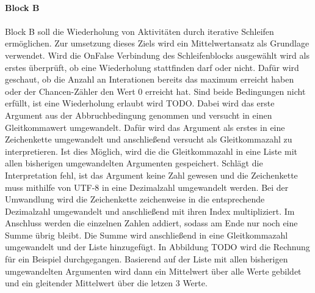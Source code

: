 \documentclass{article}
\begin{document}
    \\
    \textbf{Block B}\\
    \\
    Block B soll die Wiederholung von Aktivitäten durch iterative Schleifen ermöglichen.
    Zur umsetzung dieses Ziels wird ein Mittelwertansatz als Grundlage verwendet.
    Wird die OnFalse Verbindung des Schleifenblocks ausgewählt wird als erstes überprüft, ob eine Wiederholung stattfinden darf oder nicht.
    Dafür wird geschaut, ob die Anzahl an Interationen bereits das maximum erreicht haben oder der Chancen-Zähler den Wert 0 erreicht hat.
    Sind beide Bedingungen nicht erfüllt, ist eine Wiederholung erlaubt wird TODO.
    Dabei wird das erste Argument aus der Abbruchbedingung genommen und versucht in einen Gleitkommawert umgewandelt. %
    Dafür wird das Argument als erstes in eine Zeichenkette umgewandelt und anschließend versucht als Gleitkommazahl zu interpretieren.
    Ist dies Möglich, wird die die Gleitkommazahl in eine Liste mit allen bisherigen umgewandelten Argumenten gespeichert.
    Schlägt die Interpretation fehl, ist das Argument keine Zahl gewesen und die Zeichenkette muss mithilfe von UTF-8 in eine Dezimalzahl umgewandelt werden.
    Bei der Umwandlung wird die Zeichenkette zeichenweise in die entsprechende Dezimalzahl umgewandelt und anschließend mit ihren Index multipliziert.
    Im Anschluss werden die einzelnen Zahlen addiert, sodass am Ende nur noch eine Summe übrig bleibt.
    Die Summe wird anschließend in eine Gleitkommazahl umgewandelt und der Liste hinzugefügt.
    In Abbildung TODO wird die Rechnung für ein Beispiel durchgegangen.
    Basierend auf der Liste mit allen bisherigen umgewandelten Argumenten wird dann ein Mittelwert über alle Werte gebildet und ein gleitender Mittelwert über die letzen 3 Werte.
\end{document}
